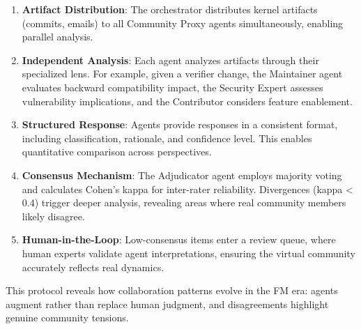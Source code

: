 \begin{enumerate}
    \item \textbf{Artifact Distribution}: The orchestrator distributes kernel artifacts (commits, emails) to all Community Proxy agents simultaneously, enabling parallel analysis.

    \item \textbf{Independent Analysis}: Each agent analyzes artifacts through their specialized lens. For example, given a verifier change, the Maintainer agent evaluates backward compatibility impact, the Security Expert assesses vulnerability implications, and the Contributor considers feature enablement.

    \item \textbf{Structured Response}: Agents provide responses in a consistent format, including classification, rationale, and confidence level. This enables quantitative comparison across perspectives.

    \item \textbf{Consensus Mechanism}: The Adjudicator agent employs majority voting and calculates Cohen's kappa for inter-rater reliability. Divergences (kappa < 0.4) trigger deeper analysis, revealing areas where real community members likely disagree.

    \item \textbf{Human-in-the-Loop}: Low-consensus items enter a review queue, where human experts validate agent interpretations, ensuring the virtual community accurately reflects real dynamics.

\end{enumerate}

This protocol reveals how collaboration patterns evolve in the FM era: agents augment rather than replace human judgment, and disagreements highlight genuine community tensions.

% 

